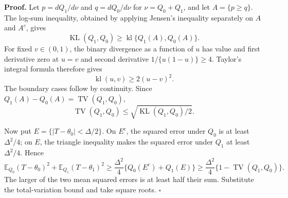 \textbf{Proof.}
Let \(p=dQ_1/d\nu\) and \(q=dQ_0/d\nu\) for \(\nu=Q_0+Q_1\), and let \(A=\{p\ge q\}\). The log-sum inequality, obtained by applying Jensen's inequality separately on \(A\) and \(A^c\), gives
\[
\operatorname{KL}(Q_1,Q_0)
\ge \operatorname{kl}\{Q_1(A),Q_0(A)\}.
\]
For fixed \(v\in(0,1)\), the binary divergence as a function of \(u\) has value and first derivative zero at \(u=v\) and second derivative \(1/\{u(1-u)\}\ge4\). Taylor's integral formula therefore gives
\[
\operatorname{kl}(u,v)\ge2(u-v)^2.
\]
The boundary cases follow by continuity. Since \(Q_1(A)-Q_0(A)=\operatorname{TV}(Q_1,Q_0)\),
\[
\operatorname{TV}(Q_1,Q_0)
\le\sqrt{\operatorname{KL}(Q_1,Q_0)/2}.
\]

Now put \(E=\{|T-\theta_0|<\Delta/2\}\). On \(E^c\), the squared error under \(Q_0\) is at least \(\Delta^2/4\); on \(E\), the triangle inequality makes the squared error under \(Q_1\) at least \(\Delta^2/4\). Hence
\[
\mathbb E_{Q_0}(T-\theta_0)^2+\mathbb E_{Q_1}(T-\theta_1)^2
\ge\frac{\Delta^2}{4}\{Q_0(E^c)+Q_1(E)\}
\ge\frac{\Delta^2}{4}\{1-\operatorname{TV}(Q_1,Q_0)\}.
\]
The larger of the two mean squared errors is at least half their sum. Substitute the total-variation bound and take square roots. \(\square\)